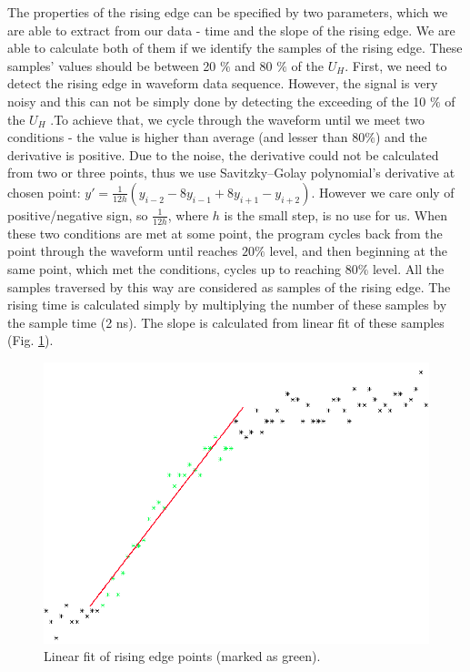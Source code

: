 \par
The properties of the rising edge can be specified by two parameters, which we are able to extract from our data - time and the slope of the rising edge. We are able to calculate both of them if we identify the samples of the rising edge. These samples' values should be between 20 $\%$ and 80 $\%$ of the $U_{H}$. First, we need to detect the rising edge in waveform data sequence. However, the signal is very noisy and this can not be simply done by detecting the exceeding of the 10 $\%$ of the $U_{H}$ .To achieve that, we cycle through the waveform until we meet two conditions - the value is higher than average (and lesser than $80 \%$) and the derivative is positive. Due to the noise, the derivative could not be calculated from two or three points, thus we use Savitzky–Golay polynomial's derivative at chosen point: $y' = \frac{1}{12h}(y_{i-2} -8y_{i-1} + 8y_{i+1} - y_{i+2}) $. However we care only of positive/negative sign, so $\frac{1}{12h}$, where $h$ is the small step, is no use for us. When these two conditions are met at some point, the program cycles back from the point through the waveform until reaches $20\%$ level, and then beginning at the same point, which met the conditions, cycles up to reaching $80\%$ level. All the samples traversed by this way are considered as samples of the rising edge. The rising time is calculated simply by multiplying the number of these samples by the sample time (2 ns). The slope is calculated from linear fit of these samples (Fig. \ref{linfit}).  


 \begin{figure}[H]
 \centering
 \includegraphics[scale=0.35]{./pictures/linFit}
 \caption{Linear fit of rising edge points (marked as green).}
 \label{linfit}
\end{figure}


